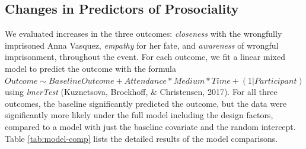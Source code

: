 \documentclass[
  man,floatsintext]{apa6}
\begin{document}
\subsection{Changes in Predictors of Prosociality}\label{changes-in-predictors-of-prosociality}

We evaluated increases in the three outcomes: \emph{closeness} with the wrongfully imprisoned Anna Vasquez, \emph{empathy} for her fate, and \emph{awareness} of wrongful imprisonment, throughout the event. For each outcome, we fit a linear mixed model to predict the outcome with the formula \(Outcome \sim Baseline Outcome + Attendance * Medium * Time + (1|Participant)\) using \emph{lmerTest} (Kuznetsova, Brockhoff, \& Christensen, 2017). For all three outcomes, the baseline significantly predicted the outcome, but the data were significantly more likely under the full model including the design factors, compared to a model with just the baseline covariate and the random intercept. Table \ref{tab:model-comp} lists the detailed results of the model comparisons.
\end{document}
